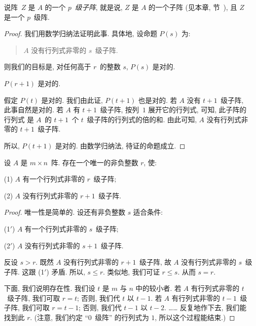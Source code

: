 \documentclass[../libro.tex]{subfiles}
\begin{document}
说阵~\(Z\) 是 \(A\) 的一个 \emph{\(p\)~级子阵},
就是说, \(Z\) 是 \(A\) 的一个子阵
(见本章, 节~),
且 \(Z\) 是一个 \(p\)~级阵.

\begin{proof}
    我们用数学归纳法证明此事.
    具体地, 设命题 \(P(s)\) 为:
    \begin{quotation}
        \(A\) 没有行列式非零的 \(s\)~级子阵.
    \end{quotation}
    则我们的目标是,
    对任何高于 \(r\)~的整数 \(s\),
    \(P(s)\) 是对的.

    \(P(r+1)\) 是对的.

    假定 \(P(t)\) 是对的.
    我们由此证, \(P(t+1)\) 也是对的.
    若 \(A\) 没有 \(t+1\)~级子阵,
    此事自然是对的.
    若 \(A\) 有 \(t+1\)~级子阵,
    按列~\(1\) 展开它的行列式,
    可知,
    此子阵的行列式%
    是 \(A\)~的 \(t+1\)~个 \(t\)~级子阵的行列式的倍的和.
    由此可知,
    \(A\) 没有行列式非零的 \(t+1\)~级子阵.

    所以, \(P(t+1)\) 是对的.
    由数学归纳法, 待证的命题成立.
\end{proof}

\begin{theorem}
    设 \(A\) 是 \(m \times n\)~阵.
    存在一个唯一的非负整数 \(r\),
    使:

    (1)
    \(A\) 有一个行列式非零的 \(r\)~级子阵;

    (2)
    \(A\) 没有行列式非零的 \(r+1\)~级子阵.
\end{theorem}

\begin{proof}
    唯一性是简单的.
    设还有非负整数 \(s\) 适合条件:

    (1\('\))
    \(A\) 有一个行列式非零的 \(s\)~级子阵;

    (2\('\))
    \(A\) 没有行列式非零的 \(s+1\)~级子阵.

    反设 \(s > r\).
    既然 \(A\) 没有行列式非零的 \(r+1\)~级子阵,
    故 \(A\) 没有行列式非零的 \(s\)~级子阵.
    这跟 (1\('\)) 矛盾.
    所以, \(s \leq r\).
    类似地, 我们可证 \(r \leq s\).
    从而 \(s = r\).

    下面, 我们说明存在性.
    我们设 \(t\) 是 \(m\) 与 \(n\) 中的较小者.
    若 \(A\) 有行列式非零的 \(t\)~级子阵,
    我们可取 \(r = t\);
    否则, 我们代 \(t\) 以 \(t - 1\).
    若 \(A\) 有行列式非零的 \(t - 1\)~级子阵,
    我们可取 \(r = t - 1\);
    否则, 我们代 \(t - 1\) 以 \(t - 2\).
    ……
    反复地作下去,
    我们能找到此 \(r\).
    (注意, 我们约定 ``\(0\)~级阵'' 的行列式为 \(1\),
    所以这个过程能结束.)
\end{proof}
\end{document}

